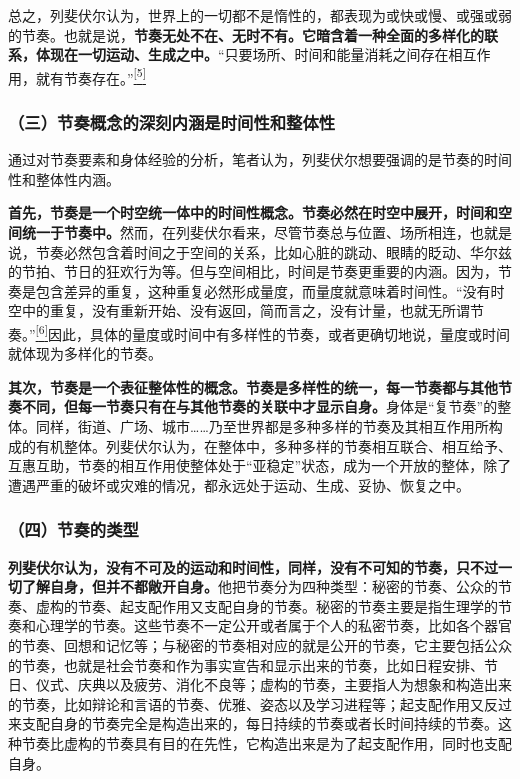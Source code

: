 \documentclass[UTF8, fontset = sourcesans, a4paper, oneside, zihao =
-4, scheme=chinese, no-math, space=true]{ctexbook}
\begin{document}
总之，列斐伏尔认为，世界上的一切都不是惰性的，都表现为或快或慢、或强或弱的节奏。也就是说，\textbf{节奏无处不在、无时不有。它暗含着一种全面的多样化的联系，体现在一切运动、生成之中。}``只要场所、时间和能量消耗之间存在相互作用，就有节奏存在。''\protect\hypertarget{part0009_split_001.htmlux5cux23w5}{}{}\protect\hyperlink{part0009_split_004.htmlux5cux23m5}{\textsuperscript{{[}5{]}}}

\subsubsection{（三）节奏概念的深刻内涵是时间性和整体性}\label{part0009_split_001.htmlux5cux23d025}

通过对节奏要素和身体经验的分析，笔者认为，列斐伏尔想要强调的是节奏的时间性和整体性内涵。

\textbf{首先，节奏是一个时空统一体中的时间性概念。节奏必然在时空中展开，时间和空间统一于节奏中。}然而，在列斐伏尔看来，尽管节奏总与位置、场所相连，也就是说，节奏必然包含着时间之于空间的关系，比如心脏的跳动、眼睛的眨动、华尔兹的节拍、节日的狂欢行为等。但与空间相比，时间是节奏更重要的内涵。因为，节奏是包含差异的重复，这种重复必然形成量度，而量度就意味着时间性。``没有时空中的重复，没有重新开始、没有返回，简而言之，没有计量，也就无所谓节奏。''\protect\hypertarget{part0009_split_001.htmlux5cux23w6}{}{}\protect\hyperlink{part0009_split_004.htmlux5cux23m6}{\textsuperscript{{[}6{]}}}因此，具体的量度或时间中有多样性的节奏，或者更确切地说，量度或时间就体现为多样化的节奏。

\textbf{其次，节奏是一个表征整体性的概念。节奏是多样性的统一，每一节奏都与其他节奏不同，但每一节奏只有在与其他节奏的关联中才显示自身。}身体是``复节奏''的整体。同样，街道、广场、城市……乃至世界都是多种多样的节奏及其相互作用所构成的有机整体。列斐伏尔认为，在整体中，多种多样的节奏相互联合、相互给予、互惠互助，节奏的相互作用使整体处于``亚稳定''状态，成为一个开放的整体，除了遭遇严重的破坏或灾难的情况，都永远处于运动、生成、妥协、恢复之中。

\subsubsection{（四）节奏的类型}\label{part0009_split_001.htmlux5cux23d026}

\textbf{列斐伏尔认为，没有不可及的运动和时间性，同样，没有不可知的节奏，只不过一切了解自身，但并不都敞开自身。}他把节奏分为四种类型：秘密的节奏、公众的节奏、虚构的节奏、起支配作用又支配自身的节奏。秘密的节奏主要是指生理学的节奏和心理学的节奏。这些节奏不一定公开或者属于个人的私密节奏，比如各个器官的节奏、回想和记忆等；与秘密的节奏相对应的就是公开的节奏，它主要包括公众的节奏，也就是社会节奏和作为事实宣告和显示出来的节奏，比如日程安排、节日、仪式、庆典以及疲劳、消化不良等；虚构的节奏，主要指人为想象和构造出来的节奏，比如辩论和言语的节奏、优雅、姿态以及学习进程等；起支配作用又反过来支配自身的节奏完全是构造出来的，每日持续的节奏或者长时间持续的节奏。这种节奏比虚构的节奏具有目的在先性，它构造出来是为了起支配作用，同时也支配自身。
\end{document}
